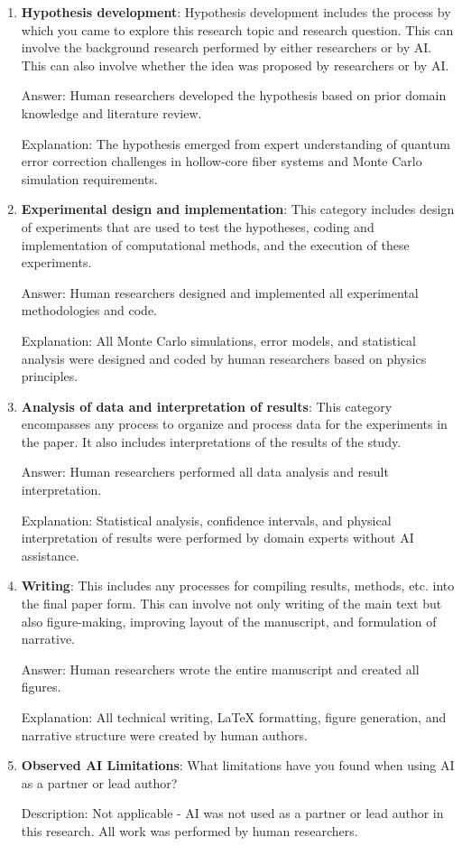 \documentclass{article}
\begin{document}
\begin{enumerate}
    \item \textbf{Hypothesis development}: Hypothesis development includes the process by which you came to explore this research topic and research question. This can involve the background research performed by either researchers or by AI. This can also involve whether the idea was proposed by researchers or by AI. 

    Answer: \involvementA{} Human researchers developed the hypothesis based on prior domain knowledge and literature review.
    
    Explanation: The hypothesis emerged from expert understanding of quantum error correction challenges in hollow-core fiber systems and Monte Carlo simulation requirements.
    
    \item \textbf{Experimental design and implementation}: This category includes design of experiments that are used to test the hypotheses, coding and implementation of computational methods, and the execution of these experiments. 

    Answer: \involvementA{} Human researchers designed and implemented all experimental methodologies and code.
    
    Explanation: All Monte Carlo simulations, error models, and statistical analysis were designed and coded by human researchers based on physics principles.
    
    \item \textbf{Analysis of data and interpretation of results}: This category encompasses any process to organize and process data for the experiments in the paper. It also includes interpretations of the results of the study.
 
    Answer: \involvementA{} Human researchers performed all data analysis and result interpretation.
    
    Explanation: Statistical analysis, confidence intervals, and physical interpretation of results were performed by domain experts without AI assistance.
    
    \item \textbf{Writing}: This includes any processes for compiling results, methods, etc. into the final paper form. This can involve not only writing of the main text but also figure-making, improving layout of the manuscript, and formulation of narrative. 

    Answer: \involvementA{} Human researchers wrote the entire manuscript and created all figures.
    
    Explanation: All technical writing, LaTeX formatting, figure generation, and narrative structure were created by human authors.

    \item \textbf{Observed AI Limitations}: What limitations have you found when using AI as a partner or lead author? 

    Description: Not applicable - AI was not used as a partner or lead author in this research. All work was performed by human researchers.
\end{enumerate}
\end{document}
